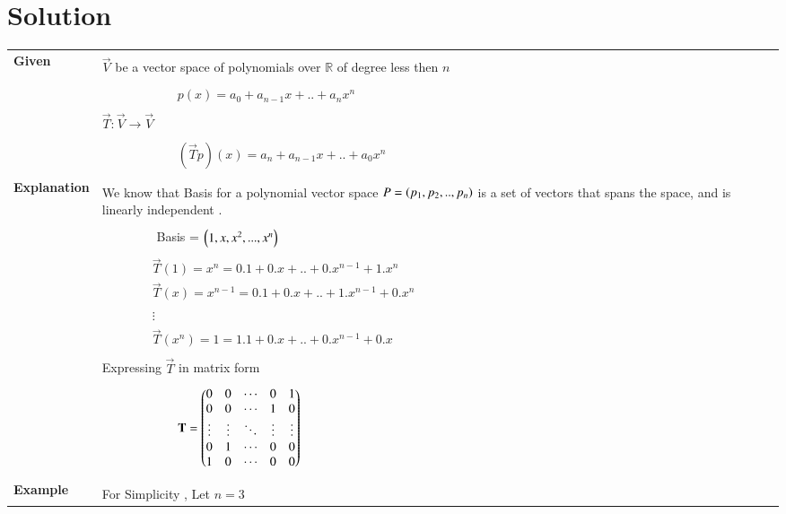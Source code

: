 \documentclass[journal,12pt]{IEEEtran}
\begin{document}
\section{\textbf{Solution}}
\renewcommand{\thetable}{1}
\begin{longtable}{|p{5cm}|p{13cm}|}
\hline
\endhead
    \multirow{3}{*}{\textbf{Given}} 
     &\\
     & $\vec{V}$ be a vector space of polynomials over $\mathbb{R}$ of degree less then $n$ \\
     &\\
     &$\qquad\qquad\qquad p(x)=a_0+a_{n-1}x+..+a_nx^{n}$\\
     &\\
     & $\vec{T}: \vec{V} \rightarrow \vec{V}$\\
     &\\
     & $\qquad\qquad\qquad(\vec{T}p)(x)=a_n+a_{n-1}x+..+a_0x^{n}$\\
     &\\
     \hline
     \multirow{3}{*}{\textbf{Explanation}}&\\
     & We know that Basis for a polynomial vector space $P=\left(p_1,p_2,..,p_n\right)$ is a set of vectors that spans the space, and is linearly independent .\\
     &\\
     &$\qquad\qquad$  Basis = $\left(1,x,x^2,...,x^{n}\right)$\\
     &\\
     & $\qquad\qquad\vec{T}(1) = x^{n} = 0.1+0.x+..+0.x^{n-1}+1.x^n$\\
     & $\qquad\qquad\vec{T}(x) = x^{n-1} = 0.1+0.x+..+1.x^{n-1}+0.x^{n}$\\
     & $\qquad\qquad\vdots$\\
     & $\qquad\qquad\vec{T}(x^{n}) = 1 = 1.1+0.x+..+0.x^{n-1}+0.x $\\
     &\\
     & Expressing $\vec{T}$ in matrix form\\
     &\\
     & $\qquad\qquad\qquad\mathbf{T}=\begin{pmatrix}0&0&\cdots&0&1\\0&0&\cdots&1&0\\\vdots&\vdots&\ddots&\vdots&\vdots\\0&1&\cdots&0&0\\1&0&\cdots&0&0\end{pmatrix}$\\ 
     &\\
    \hline
    \multirow{3}{*}{\textbf{Example} }
	& \\
	& For Simplicity , Let $n=3$\\

\end{longtable}
\end{document}
